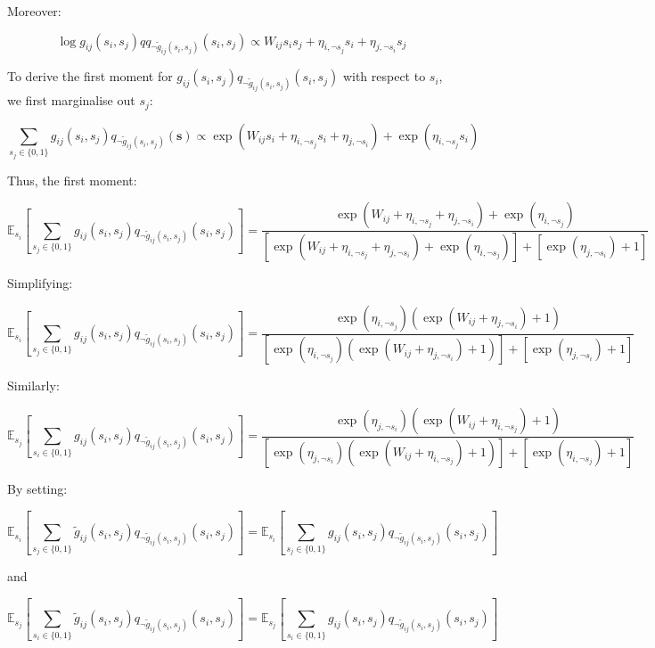 \documentclass[12pt]{article}
\begin{document}
Moreover:

\[\log g_{ij}(s_i, s_j) qq_{\neg \tilde{g}_{ij}(s_i, s_j)}(s_i, s_j) \propto W_{ij} s_i s_j
 + \eta_{i, \neg s_j} s_i + \eta_{j, \neg s_i} s_j\]

To derive the first moment for $ g_{ij}(s_i, s_j) q_{\neg \tilde{g}_{ij}(s_i, s_j)}(s_i, s_j)$ with respect to $s_i$, we first marginalise out $s_j$:

\[ \sum_{s_j \in \{0, 1\}} g_{ij}(s_i, s_j) q_{\neg \tilde{g}_{ij}(s_i, s_j)}(\textbf{s}) \propto \exp\left( W_{ij} s_i + \eta_{i, \neg s_j} s_i + \eta_{j, \neg s_i}\right) +  \exp\left(\eta_{i, \neg s_j} s_i \right)
\]

Thus, the first moment:

\[\mathbb{E}_{s_i}\left[\sum_{s_j \in \{0, 1\}}g_{ij}(s_i, s_j) q_{\neg \tilde{g}_{ij}(s_i, s_j)}(s_i, s_j)\right] = \frac{\exp\left( W_{ij} + \eta_{i, \neg s_j}  + \eta_{j, \neg s_i}\right) +  \exp\left(\eta_{i, \neg s_j}\right)}{\left[\exp\left( W_{ij} + \eta_{i, \neg s_j}  + \eta_{j, \neg s_i}\right) +  \exp\left(\eta_{i, \neg s_j}\right)\right]+\left[\exp\left( \eta_{j, \neg s_i}\right) +  1\right]}\]

Simplifying:

\[\mathbb{E}_{s_i}\left[\sum_{s_j \in \{0, 1\}}g_{ij}(s_i, s_j) q_{\neg \tilde{g}_{ij}(s_i, s_j)}(s_i, s_j)\right] = \frac{\exp\left(\eta_{i, \neg s_j}\right)\left(\exp\left( W_{ij}  + \eta_{j, \neg s_i}\right) + 1\right)  }{\left[\exp\left(\eta_{i, \neg s_j}\right)\left(\exp\left( W_{ij}  + \eta_{j, \neg s_i}\right) + 1\right)  \right]+\left[\exp\left( \eta_{j, \neg s_i}\right) +  1\right]}\]

Similarly:

\[\mathbb{E}_{s_j}\left[\sum_{s_i \in \{0, 1\}}g_{ij}(s_i, s_j) q_{\neg \tilde{g}_{ij}(s_i, s_j)}(s_i, s_j)\right] = \frac{\exp\left(\eta_{j, \neg s_i}\right)\left(\exp\left( W_{ij}  + \eta_{i, \neg s_j}\right) + 1\right)  }{\left[\exp\left(\eta_{j, \neg s_i}\right)\left(\exp\left( W_{ij}  + \eta_{i, \neg s_j}\right) + 1\right) \right]+\left[\exp\left( \eta_{i, \neg s_j}\right) +  1\right]}\]


By setting:

\[\mathbb{E}_{s_i}\left[\sum_{s_j \in \{0, 1\}}\tilde{g}_{ij}(s_i, s_j) q_{\neg \tilde{g}_{ij}(s_i, s_j)}(s_i, s_j)\right] = \mathbb{E}_{s_i}\left[\sum_{s_j \in \{0, 1\}}g_{ij}(s_i, s_j) q_{\neg \tilde{g}_{ij}(s_i, s_j)}(s_i, s_j)\right]\]


and

\[\mathbb{E}_{s_j}\left[\sum_{s_i \in \{0, 1\}}\tilde{g}_{ij}(s_i, s_j) q_{\neg \tilde{g}_{ij}(s_i, s_j)}(s_i, s_j)\right] = \mathbb{E}_{s_j}\left[\sum_{s_i \in \{0, 1\}}g_{ij}(s_i, s_j) q_{\neg \tilde{g}_{ij}(s_i, s_j)}(s_i, s_j)\right]\]
\end{document}
